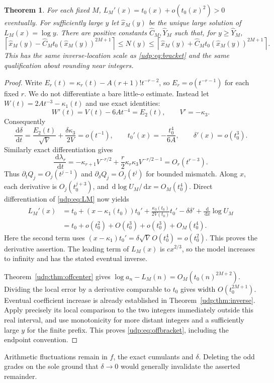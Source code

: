 \documentclass[11pt]{article}
\newtheorem{theorem}{Theorem}[section]
\theoremstyle{remark}\newtheorem{remark}[theorem]{Remark}
\newcommand{\dd}{\,\mathrm d}
\numberwithin{equation}{section}
\begin{document}
\begin{theorem}\label{udp:thm:offinverse}
For each fixed $M$, $L_M'(x)=t_0(x)+o(t_0(x)^2)>0$ eventually. For sufficiently large $y$ let $\widehat x_M(y)$ be the unique large solution of $L_M(x)=\log y$. There are positive constants $\widehat C_M,\widehat Y_M$ such that, for $y\ge\widehat Y_M$,
\begin{equation}\label{udp:eq:offbracket}
 \left\lceil\widehat x_M(y)-\widehat C_Mt_0(\widehat x_M(y))^{2M+1}\right\rceil
 \le N(y)\le
 \left\lceil\widehat x_M(y)+\widehat C_Mt_0(\widehat x_M(y))^{2M+1}\right\rceil.
\end{equation}
This has the same inverse-location scale as \eqref{udp:eq:bracket} and the same qualification about rounding near integers.
\end{theorem}
\begin{proof}
Write $E_r(t)=\kappa_r(t)-A(r+1)!t^{-r-2}$, so $E_r=o(t^{-r-1})$ for each fixed $r$. We do not differentiate a bare little-$o$ estimate. Instead let $W(t)=2At^{-3}-\kappa_1(t)$ and use exact identities:
\[
 W'(t)=V(t)-6At^{-4}=E_2(t),\qquad V'=-\kappa_3.
\]
Consequently
\begin{equation}\label{udp:eq:deltaprime}
 \frac{\dd\delta}{\dd t}=\frac{E_2(t)}{\sqrt V}
          +\frac{\delta\kappa_3}{2V}=o(t^{-1}),\qquad
 t_0'(x)=-\frac{t_0^4}{6A},\qquad \delta'(x)=o(t_0^3).
\end{equation}
Similarly exact differentiation gives
\[
 \frac{\dd\lambda_r}{\dd t}
 =-\kappa_{r+1}V^{-r/2}
 +\frac r2\kappa_r\kappa_3V^{-r/2-1}=O_r(t^{r-3}).
\]
Thus $\partial_tQ_j=O_j(t^{j-1})$ and $\partial_\delta Q_j=O_j(t^j)$ for bounded mismatch. Along $x$, each derivative is $O_j(t_0^{j+3})$, and $\dd\log U_M/\dd x=O_M(t_0^4)$. Direct differentiation of \eqref{udp:eq:LM} now yields
\begin{align*}
 L_M'(x)&=t_0+(x-\kappa_1(t_0))t_0'
       +\frac{\kappa_3(t_0)}{2V(t_0)}t_0'
       -\delta\delta'+\frac{\dd}{\dd x}\log U_M\\
 &=t_0+o(t_0^2)+O(t_0^3)+o(t_0^3)+O_M(t_0^4).
\end{align*}
Here the second term uses $(x-\kappa_1)t_0'=\delta\sqrt V\,O(t_0^4)=o(t_0^2)$. This proves the derivative assertion. The leading term of $L_M(x)$ is $cx^{2/3}$, so the model increases to infinity and has the stated eventual inverse.

Theorem~\ref{udp:thm:offcenter} gives $\log a_n-L_M(n)=O_M(t_0(n)^{2M+2})$. Dividing the local error by a derivative comparable to $t_0$ gives width $O(t_0^{2M+1})$. Eventual coefficient increase is already established in Theorem~\ref{udp:thm:inverse}. Apply precisely its local comparison to the two integers immediately outside this real interval, and use monotonicity for more distant integers and a sufficiently large $y$ for the finite prefix. This proves \eqref{udp:eq:offbracket}, including the endpoint convention.
\end{proof}
Arithmetic fluctuations remain in $f$, the exact cumulants and $\delta$. Deleting the odd grades on the sole ground that $\delta\to0$ would generally invalidate the asserted remainder.
\end{document}
